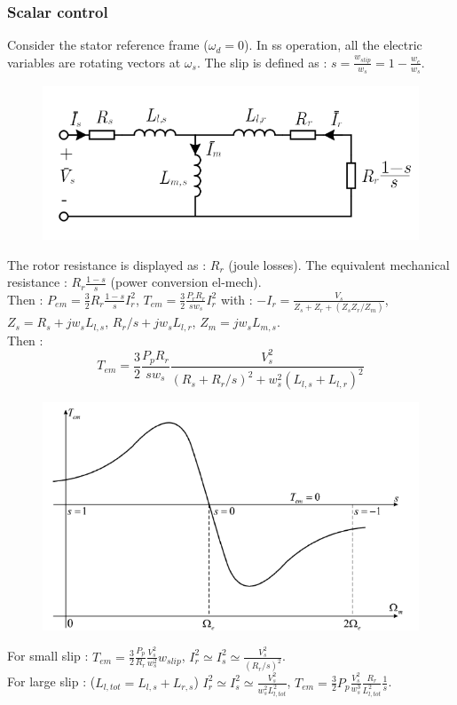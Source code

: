 \documentclass[../main.tex]{subfiles}
\begin{document}
\subsubsection{Scalar control}
Consider the stator reference frame ($\omega_d = 0$). In ss operation, all the electric variables are rotating vectors at $\omega_s$. The slip is defined as : $s = \frac{w_{slip}}{w_s} = 1-\frac{w_e}{w_s}$.\\

\begin{figure}[hbt!]
    \centering
    \includegraphics[width=0.5\linewidth]{IMAGES/Indus_el/Screenshot from 2025-04-07 16-23-23.png}
\end{figure}

The rotor resistance is displayed as : $R_r$ (joule losses). The equivalent mechanical resistance : $R_r \frac{1-s}{s}$ (power conversion el-mech).\\
Then : $P_{em} = \frac{3}{2} R_r \frac{1-s}{s} I_r^2$, $T_{em} = \frac{3}{2} \frac{P_r R_r}{sw_s} I_r^2$ with : $-I_r = \frac{V_s}{Z_s + Z_r + (Z_sZ_r/Z_m)}$, $Z_s = R_s+jw_s L_{l,s}$, $R_r/s + jw_s L_{l,r}$, $Z_m = jw_s L_{m,s}$.\\
Then : \begin{equation}
    T_{em} = \frac{3}{2} \frac{P_p R_r}{sw_s} \frac{V_s^2}{(R_s+R_r/s)^2 + w_s^2(L_{l,s} + L_{l,r})^2}
\end{equation}

\begin{figure}[hbt!]
    \centering
    \includegraphics[width=0.5\linewidth]{IMAGES/Indus_el/Screenshot from 2025-04-07 16-28-49.png}
\end{figure}

For small slip : $T_{em} = \frac{3}{2} \frac{P_p}{R_r} \frac{V_s^2}{w_s^2} w_{slip}$, $I_r^2 \simeq I_s^2 \simeq \frac{V_s^2}{(R_r/s)^2}$.\\
For large slip : ($L_{l,tot} = L_{l,s} + L_{r,s}$) $I_r^2\simeq I_s^2 \simeq \frac{V_s^2}{w_s^2 L_{l,tot}^2}$, $T_{em} = \frac{3}{2} P_p \frac{V_s^2}{w_s^3} \frac{R_r}{L_{l,tot}^2} \frac{1}{s}$.\\
\end{document}
